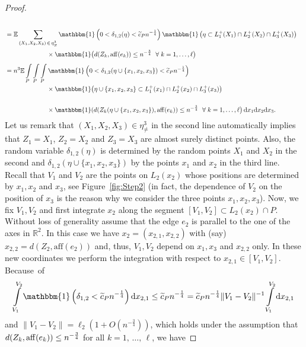 \documentclass[10pt]{amsart}
\theoremstyle{definition}\newtheorem{defi}[theo]{Definition}\newtheorem{rema}[theo]{Remark}\newtheorem{exam}[theo]{Example}\newtheorem{exem}[theo]{Example}\newtheorem{nota}[theo]{Notation}
\newcommand{\ind}{\mathbbm{1}}
\newcommand{\bbR}{\mathbb{R}}
\newcommand{\bbE}{\mathbb{E}}
\newcommand{\aff}{\mathrm{aff}}
\let\oldtilde\tilde
\renewcommand*{\tilde}[1]{\mathchoice{\widetilde{#1}}{\widetilde{#1}}{\oldtilde{#1}}{\oldtilde{#1}}}
\let\oldforall\forall
\renewcommand*{\forall}{\mathrel{\oldforall}}
\begin{document}
\begin{proof}
\begin{align*}
\\
& =
\bbE \sum_{(X_1, X_2,X_3)\,\in\,\eta_{\neq}^3} \ind \left(0<\delta_{1,2}(\eta)< \tilde c_P n^{- \frac 14}\right) \ind\left(\eta \subset L_1^+(X_1) \cap L_2^+ (X_2)\cap L_3^+ (X_3)\right)\\
&\hspace{2.3cm}\times
\ind\big(d(Z_k, \aff(e_k)) \leq n^{- \frac 34}\ \forall k=1,\ldots,\ell \big)
\\[1ex] &= n^3 \bbE \int\limits_{P}\int\limits_{P}\int\limits_{P} \ind\left(0<\delta_{1,2}(\eta\cup\{x_1,x_2,x_3\}) < \tilde c_P n^{- \frac 14}\right)
\\ &\hspace{2.3cm}\times
\ind \big(\eta\cup\{x_1,x_2,x_3\} \subset L_1^+(x_1) \cap L_2^+ (x_2)\cap L_3^+ (x_3)\big)\\
\\ &\hspace{2.3cm}\times
\ind(d(Z_k(\eta\cup\{x_1,x_2,x_3\}), \aff(e_k)) \leq n^{- \frac 34}\ \forall k=1,\ldots,\ell \big) \,\mathrm{d} x_1\mathrm{d} x_2\mathrm{d} x_3.
\end{align*}
Let us remark that $(X_1, X_2,X_3) \in \eta_{\neq}^3$ in the second line automatically implies that $Z_1=X_1$, $Z_2=X_2$ and $Z_3=X_3$ are almost surely distinct points. Also, the random variable $\delta_{1,2}(\eta)$ is determined by the random points $X_1$ and $X_2$ in the second and $\delta_{1,2}(\eta\cup\{x_1,x_2,x_3\})$ by the points $x_1$ and $x_2$ in the third line. Recall that $V_1$ and $V_2$ are the points on $L_2(x_2)$ whose positions are determined by $x_1,x_2$ and $x_3$, see Figure~\ref{fig:Step2} (in fact, the dependence of $V_2$ on the position of $x_3$ is the reason why we consider the three points $x_1,x_2,x_3$). Now, we fix $V_1, V_2$ and first integrate $x_2$ along the segment $[V_1, V_2] \subset L_2(x_2) \cap P$. Without loss of generality assume that the edge $e_2$ is parallel to the one of the axes in $\bbR^2$. In this case we have $x_2=(x_{2,1},x_{2,2})$ with (say) $x_{2,2}=d(Z_2,\aff(e_2))$ and, thus, $V_1,V_2$ depend on $x_1,x_3$ and $x_{2,2}$ only. In these new coordinates we perform the integration with respect to $x_{2,1}\in [V_1, V_2]$. Because~of
\[
\int\limits_{V_1}^{V_2} \ind\left(\delta_{1,2} <\tilde c_P n^{- \frac 14}\right) \mathrm{d} x_{2,1}
\leq
\tilde c_P n^{- \frac 14} =
\tilde c_P n^{- \frac 14} \| V_1-V_2 \|^{-1} \int\limits_{V_1}^{V_2} \mathrm{d} x_{2,1}
\]
and $\| V_1-V_2 \| = \ell_2(1+O(n^{- \frac 34}))$, which holds under the assumption that $d(Z_k, \aff(e_k))\linebreak \leq n^{- \frac 34}$ for all $k=1,\,\ldots,\,\ell$, we have

\end{proof}
\end{document}
